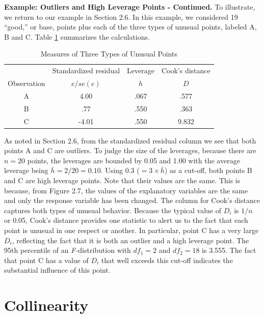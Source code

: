 \linejed{}

\textbf{Example: Outliers and High Leverage Points - Continued.} To
illustrate, we return to our example in Section 2.6. In this
example, we considered 19 ``good,'' or base, points plus each of the
three types of unusual points, labeled A, B and C. Table
\ref{T5:Outliers} summarizes the calculations.

\begin{table}[h]

\caption{\label{T5:Outliers} Measures of Three Types of Unusual
Points}
\begin{tabular}{cccc}
\hline
& Standardized residual & Leverage & Cook's distance \\
Observation & $e/se(e)$ & $h$ & $D$ \\ \hline
A & 4.00 & .067 & .577 \\
 B & .77 & .550 & .363 \\
C & -4.01 & .550 & 9.832 \\ \hline
\end{tabular}
\end{table}

As noted in Section 2.6, from the standardized residual column we
see that both points A and C are outliers. To judge the size of the
leverages, because there are $n=20$ points, the leverages are
bounded by 0.05 and 1.00 with the average leverage being
$\bar{h}=2/20=0.10$. Using 0.3 ($ = 3 \times  \bar{h}$) as a
cut-off, both points B and C are high leverage points. Note that
their values are the same. This is because, from Figure 2.7, the
values of the explanatory variables are the same and only the
response variable has been changed. The column for Cook's distance
captures both types of unusual behavior. Because the typical value
of $D_i$ is $1/n$ or 0.05, Cook's distance provides one statistic to
alert us to the fact that each point is unusual in one respect or
another. In particular, point C has a very large $D_i$, reflecting
the fact that it is both an outlier and a high leverage point. The
95th percentile of an \textit{F-}distribution with $df_1=2$ and
$df_2=18$ is 3.555. The fact that point C has a value of $D_i$ that
well exceeds this cut-off indicates the substantial influence of
this point.

\linejed

\section{Collinearity}

